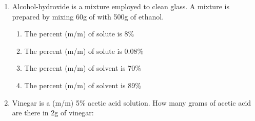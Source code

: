 \documentclass[main.tex]{subfiles}
\begin{document}
\begin{multicols*}{2}
\begin{enumerate}
\item Alcohol-hydroxide is a mixture employed to clean glass. A mixture is prepared by mixing 60g of  with 500g of ethanol.
\begin{enumerate}[label=(\alph*)]
\item The percent (m/m) of solute is 8\% %
\item The percent (m/m) of solute is 0.08\% %
\item The percent (m/m) of solvent is 70\% %
\item The percent (m/m) of solvent is 89\% %
\end{enumerate}

%

\item Vinegar is a (m/m) 5\% acetic acid solution. How many grams of acetic acid are there in 2g of vinegar:
\begin{enumerate}[label=(\alph*)]
\end{enumerate}


\end{enumerate}
\end{multicols*}
\end{document}
